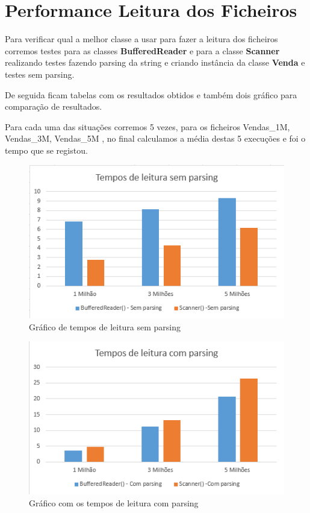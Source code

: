  
\section{Performance Leitura dos Ficheiros}

\par Para verificar qual a melhor classe a usar para fazer a leitura dos ficheiros corremos testes para as classes
\color{blue} \textbf{BufferedReader} \color{black} e para a classe \color{blue} \textbf{Scanner} \color{black} realizando testes
fazendo parsing da string e criando instância da classe \color{blue} \textbf{Venda} \color{black} e testes sem parsing.
\par De seguida ficam tabelas com os resultados obtidos e também dois gráfico para comparação de resultados.

Para cada uma das situações corremos 5 vezes, para os ficheiros Vendas\_1M, Vendas\_3M, Vendas\_5M , no final calculamos a média destas 5 execuções e foi o tempo que se registou.

\begin{figure}[h!]
	\includegraphics[scale=1]{graficosemparsing}  
	\caption{Gráfico de tempos de leitura sem parsing }  
\end{figure}

\begin{figure}[h!]
	\includegraphics[scale=1]{graficocomparsing}  
	\caption{Gráfico com os tempos de leitura com parsing }  
\end{figure}

